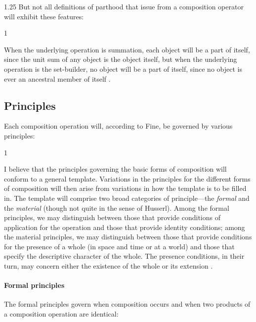 \documentclass[11pt]{article}
\newenvironment{squote}{%
\begin{spacing}{1}
       	\begin{list}{}{%
\setlength{\labelwidth}{0pt}%
\rightmargin\leftmargin%
}
\item\relax
}{%
\end{list}%
\end{spacing}
}
\begin{document}
\begin{spacing}{1.25}
But not all definitions of parthood that issue from a composition
operator will exhibit these features:

\begin{squote}
When the underlying operation is summation, each object will be a part
of itself, since the unit sum of any object is the object itself, but
when the underlying operation is the set-builder, no object will be a
part of itself, since no object is ever an ancestral member of itself
\citep[569]{fine2010}.
\end{squote}

\subsection{Principles}
\label{principle}
Each composition operation will, according to Fine, be governed by
various principles:

\begin{squote}
I believe that the principles governing the basic forms of composition
will conform to a general template.  Variations in the principles for
the different forms of composition will then arise from variations in
how the template is to be filled in.  The template will comprise two
broad categories of principle---the {\em formal} and the {\em
  material} (though not quite in the sense of Husserl).  Among the
formal principles, we may distinguish between those that provide
conditions of application for the operation and those that provide
identity conditions; among the material principles, we may distinguish
between those that provide conditions for the presence of a whole (in
space and time or at a world) and those that specify the descriptive
character of the whole.  The presence conditions, in their turn, may
concern either the existence of the whole or its extension
\citeyearpar[569--570]{fine2010}.
\end{squote}

\paragraph{Formal principles}
The formal principles govern when composition occurs and when two
products of a composition operation are identical:


\end{spacing}
\end{document}
